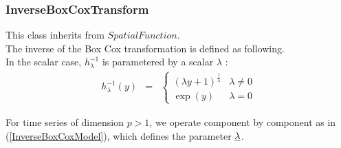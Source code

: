 \newpage \subsubsection{InverseBoxCoxTransform}


This class inherits from $SpatialFunction$. \\
The inverse of the Box Cox transformation is defined as following.\\
In the scalar case, $h^{-1}_\lambda$ is parametered by a scalar $\lambda$ :
\begin{eqnarray}
 \label{InverseBoxCoxModel}
 h^{-1}_\lambda(y) & = &
\left\{
\begin{array}{ll}
\displaystyle (\lambda y + 1)^{\frac{1}{\lambda}} & \lambda \neq 0 \\
\displaystyle \exp(y) 			   & \lambda = 0
\end{array}
\right.
\end{eqnarray}

For time series of dimension $p>1$, we operate component by component as in (\ref{InverseBoxCoxModel}), which defines the parameter ${\underline{\lambda}}$.



